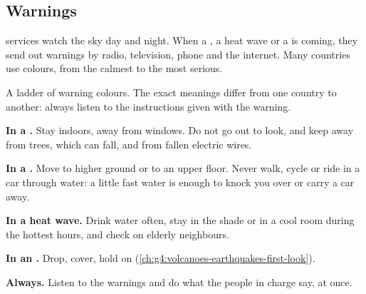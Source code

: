 \subsection*{Warnings}

 services watch the sky day and night. When a , a heat wave or
a  is coming, they send out warnings by radio, television, phone and
the internet. Many countries use colours, from the calmest to the most
serious.

\begin{omfigure}

{\small A ladder of warning colours. The exact meanings differ from one
country to another: always listen to the instructions given with the
warning.}
\end{omfigure}

\begin{safety}
\textbf{In a .} Stay indoors, away from windows. Do not go out to
look, and keep away from trees, which can fall, and from fallen electric
wires.

\textbf{In a .} Move to higher ground or to an upper floor. Never
walk, cycle or ride in a car through  water: a little fast water is
enough to knock you over or carry a car away.

\textbf{In a heat wave.} Drink water often, stay in the shade or in a cool
room during the hottest hours, and check on elderly neighbours.

\textbf{In an .} Drop, cover, hold on
(\cref{ch:g4:volcanoes-earthquakes-first-look}).

\textbf{Always.} Listen to the warnings and do what the people in charge
say, at once.
\end{safety}

